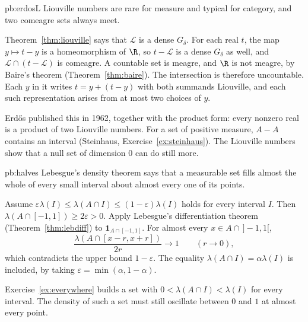 \begin{solution}{pb:erdosL}
\idea Liouville numbers are rare for measure and typical for category, and two comeagre sets always meet.

\writeup Theorem~\ref{thm:liouville} says that $\mathcal L$ is a dense $G_\delta$. For each real $t$, the map $y\mapsto t-y$ is a homeomorphism of $\R$, so $t-\mathcal L$ is a dense $G_\delta$ as well, and $\mathcal L\cap(t-\mathcal L)$ is comeagre. A countable set is meagre, and $\R$ is not meagre, by Baire's theorem (Theorem~\ref{thm:baire}). The intersection is therefore uncountable. Each $y$ in it writes $t=y+(t-y)$ with both summands Liouville, and each such representation arises from at most two choices of $y$.

\leads Erdős published this in 1962, together with the product form: every nonzero real is a product of two Liouville numbers. For a set of positive measure, $A-A$ contains an interval (Steinhaus, Exercise~\ref{ex:steinhaus}). The Liouville numbers show that a null set of dimension $0$ can do still more.
\end{solution}

\begin{solution}{pb:halves}
\idea Lebesgue's density theorem says that a measurable set fills almost the whole of every small interval about almost every one of its points.

\writeup Assume $\varepsilon\lambda(I)\le\lambda(A\cap I)\le(1-\varepsilon)\lambda(I)$ holds for every interval $I$. Then $\lambda(A\cap[-1,1])\ge 2\varepsilon>0$. Apply Lebesgue's differentiation theorem (Theorem~\ref{thm:lebdiff}) to $\mathbf 1_{A\cap[-1,1]}$. For almost every $x\in A\cap\,]-1,1[$,
\[
\frac{\lambda(A\cap[x-r,x+r])}{2r}\to 1\qquad(r\to 0),
\]
which contradicts the upper bound $1-\varepsilon$. The equality $\lambda(A\cap I)=\alpha\lambda(I)$ is included, by taking $\varepsilon=\min(\alpha,1-\alpha)$.

\leads Exercise~\ref{ex:everywhere} builds a set with $0<\lambda(A\cap I)<\lambda(I)$ for every interval. The density of such a set must still oscillate between $0$ and $1$ at almost every point.
\end{solution}

